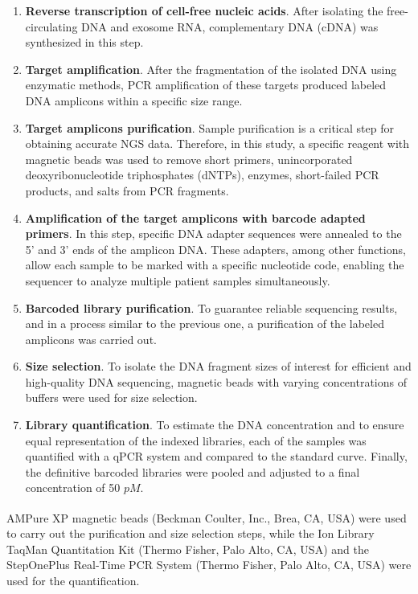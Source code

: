 \begin{enumerate}[font=\bfseries]
    \item \textbf{Reverse transcription of cell-free nucleic acids}. After isolating the free-circulating DNA and exosome RNA, complementary DNA (cDNA) was synthesized in this step.
    \item \textbf{Target amplification}. After the fragmentation of the isolated DNA using enzymatic methods, PCR amplification of these targets produced labeled DNA amplicons within a specific size range.
    \item \textbf{Target amplicons purification}. Sample purification is a critical step for obtaining accurate NGS data. Therefore, in this study, a specific reagent with magnetic beads was used to remove short primers, unincorporated deoxyribonucleotide triphosphates (dNTPs), enzymes, short-failed PCR products, and salts from PCR fragments.
    \item \textbf{Amplification of the target amplicons with barcode adapted primers}. In this step, specific DNA adapter sequences were annealed to the 5' and 3' ends of the amplicon DNA. These adapters, among other functions, allow each sample to be marked with a specific nucleotide code, enabling the sequencer to analyze multiple patient samples simultaneously.
    \item \textbf{Barcoded library purification}. To guarantee reliable sequencing results, and in a process similar to the previous one, a purification of the labeled amplicons was carried out.
    \item \textbf{Size selection}. To isolate the DNA fragment sizes of interest for efficient and high-quality DNA sequencing, magnetic beads with varying concentrations of buffers were used for size selection.
    \item \textbf{Library quantification}. To estimate the DNA concentration and to ensure equal representation of the indexed libraries, each of the samples was quantified with a qPCR system and compared to the standard curve. Finally, the definitive barcoded libraries were pooled and adjusted to a final concentration of 50 $pM$.
\end{enumerate}

AMPure XP\textsuperscript\textregistered{} magnetic beads (Beckman Coulter, Inc., Brea, CA, USA) were used to carry out the purification and size selection steps, while the Ion Library TaqMan\texttrademark{} Quantitation Kit (Thermo Fisher, Palo Alto, CA, USA) and the StepOnePlus\texttrademark{} Real-Time PCR System (Thermo Fisher, Palo Alto, CA, USA) were used for the quantification.

